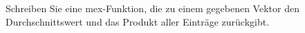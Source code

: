 \begin{aufg}
Schreiben Sie eine mex-Funktion, die zu einem gegebenen Vektor den
  Durchschnittswert und das Produkt aller Eintr\"age zur\"uckgibt.  
\end{aufg}